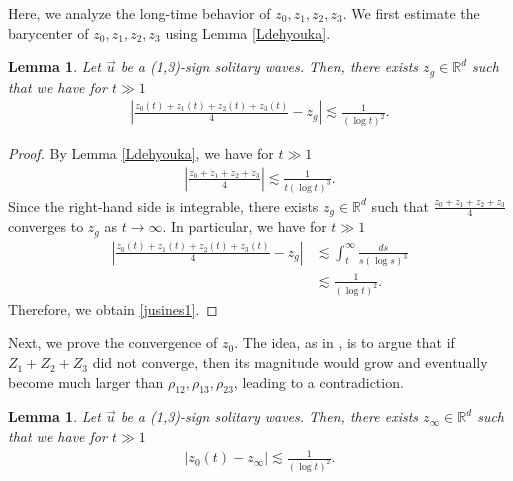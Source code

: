 \documentclass[reqno]{amsart}
\theoremstyle{plain}
\newtheorem{lemma}[theorem]{Lemma}
\theoremstyle{definition}
\numberwithin{equation}{section}
\newcommand{\1}{\mathbbm{1}}
\begin{document}
Here, we analyze the long-time behavior of $z_0,z_1,z_2,z_3$.
We first estimate the barycenter of $z_0,z_1,z_2,z_3$ using Lemma \ref{Ldehyouka}.
\begin{lemma}\label{jusines}
Let $\vec{u}$ be a (1,3)-sign solitary waves. Then, there exists $z_g\in \mathbb{R}^d$ such that we have for $t\gg 1$
\begin{align}\label{jusines1}
\left|\frac{z_0(t)+z_1(t)+z_2(t)+z_3(t)}{4}-z_g\right|\lesssim \frac{1}{(\log{t})^2}.
\end{align}
\end{lemma}
\begin{proof}
By Lemma \ref{Ldehyouka}, we have for $t\gg 1$
\begin{align*}
\left|\frac{\dot{z}_0+\dot{z}_1+\dot{z}_2+\dot{z}_3}{4}\right|\lesssim \frac{1}{t(\log{t})^3}.
\end{align*}
Since the right-hand side is integrable, there exists $z_g\in\mathbb{R}^d$ such that
$\frac{z_0+z_1+z_2+z_3}{4}$ converges to $z_g$ as $t\to\infty$. In particular, we have for $t\gg 1$
\begin{align*}
\left|\frac{z_0(t)+z_1(t)+z_2(t)+z_3(t)}{4}-z_g\right|&\lesssim \int_t^{\infty} \frac{ds}{s(\log{s})^3}
\\
&\lesssim \frac{1}{(\log{t})^2}.
\end{align*}
Therefore, we obtain \eqref{jusines1}.
\end{proof}
Next, we prove the convergence of $z_0$. The idea, as in \cite[Lemma 4.8]{I2}, is to argue that if $Z_1+Z_2+Z_3$ did not converge, then its magnitude would grow and eventually become much larger than $\rho_{12},\rho_{13},\rho_{23}$, leading to a contradiction.
\begin{lemma}\label{z0ugokanai}
Let $\vec{u}$ be a (1,3)-sign solitary waves. Then, there exists $z_{\infty}\in \mathbb{R}^d$ such that we have for $t\gg 1$
\begin{align}\label{z0es128}
|z_0(t)-z_{\infty}|\lesssim \frac{1}{(\log{t})^{2}}.
\end{align}
\end{lemma}
\end{document}
